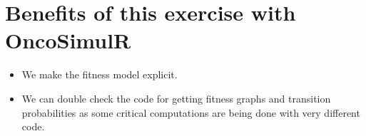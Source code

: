 \documentclass[11pt]{article}
\begin{document}
\section{Benefits of this exercise with OncoSimulR}
\label{sec:org4a55091}
\begin{itemize}
\item We make the fitness model explicit.
\item We can double check the code for getting fitness graphs and transition
probabilities as some critical computations are being done with very
different code.
\end{itemize}
\end{document}
